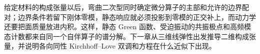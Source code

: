 给定材料的构成张量以后，弯曲二次型同时确定微分算子的主部和允许的边界配对；边界条件若留下刚体零模，静态响应就必须投影到零模的正交补上，而动力学还要把面质量放进内积。这样，静态 Green 函数、受迫振动的共振极点和高频模态计数都来自同一个自伴算子的谱分解。下一章从三维线弹性出发推导二维构成张量，并说明各向同性 Kirchhoff--Love 双调和方程在什么近似下出现。

